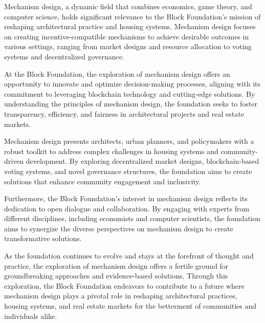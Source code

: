 Mechanism design, a dynamic field that combines economics, game theory, and computer science, holds significant relevance to the Block Foundation's mission of reshaping architectural practice and housing systems. Mechanism design focuses on creating incentive-compatible mechanisms to achieve desirable outcomes in various settings, ranging from market designs and resource allocation to voting systems and decentralized governance.

At the Block Foundation, the exploration of mechanism design offers an opportunity to innovate and optimize decision-making processes, aligning with its commitment to leveraging blockchain technology and cutting-edge solutions. By understanding the principles of mechanism design, the foundation seeks to foster transparency, efficiency, and fairness in architectural projects and real estate markets.

Mechanism design presents architects, urban planners, and policymakers with a robust toolkit to address complex challenges in housing systems and community-driven development. By exploring decentralized market designs, blockchain-based voting systems, and novel governance structures, the foundation aims to create solutions that enhance community engagement and inclusivity.

Furthermore, the Block Foundation's interest in mechanism design reflects its dedication to open dialogue and collaboration. By engaging with experts from different disciplines, including economists and computer scientists, the foundation aims to synergize the diverse perspectives on mechanism design to create transformative solutions.

As the foundation continues to evolve and stays at the forefront of thought and practice, the exploration of mechanism design offers a fertile ground for groundbreaking approaches and evidence-based solutions. Through this exploration, the Block Foundation endeavors to contribute to a future where mechanism design plays a pivotal role in reshaping architectural practices, housing systems, and real estate markets for the betterment of communities and individuals alike.